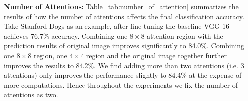 \documentclass[10pt,twocolumn,letterpaper]{article}
\begin{document}
\textbf{Number of Attentions:}
Table~\ref{tab:number_of_attention} summarizes the results of how the number of attentions affects the final classification accuracy.
Take Stanford Dogs as an example, after fine-tuning the baseline VGG-16 achieves 76.7\% accuracy.
Combining one $8\times8$ attention region with the prediction results of original image improves significantly to 84.0\%.
Combining one $8\times8$ region, one $4\times4$ region and the original image together further improves the results to 84.2\%.
We find adding more than two attentions (i.e. 3 attentions) only improves the performance slightly to 84.4\% at the expense of more computations.
Hence throughout the experiments we fix the number of attentions as two.


\end{document}
